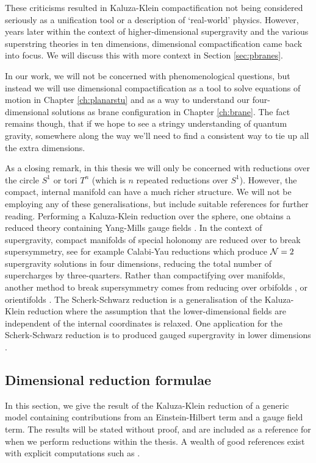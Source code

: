 These criticisms resulted in Kaluza-Klein compactification not being considered seriously as a unification tool or a description of `real-world' physics. However, years later within the context of higher-dimensional supergravity and the various superstring theories in ten dimensions, dimensional compactification came back into focus. We will discuss this with more context in Section \ref{sec:pbranes}.

In our work, we will not be concerned with phenomenological questions, but instead we will use dimensional compactification as a tool to solve equations of motion in Chapter \ref{ch:planarstu} and as a way to understand our four-dimensional solutions as brane configuration in Chapter \ref{ch:brane}.  The fact remains though, that if we hope to see a stringy understanding of quantum gravity, somewhere along the way we'll need to find a consistent way to tie up all the extra dimensions.

As a closing remark, in this thesis we will only be concerned with reductions over the circle $S^1$ or tori $T^n$ (which is $n$ repeated reductions over $S^1$). However, the compact, internal manifold can have a much richer structure. We will not be employing any of these generalisations, but include suitable references for further reading. Performing a Kaluza-Klein reduction over the sphere, one obtains a reduced theory containing Yang-Mills gauge fields \cite{Popekk}. In the context of supergravity, compact manifolds of special holonomy are reduced over to break supersymmetry, see for example Calabi-Yau reductions \cite{Candelas:1990pi, Bodner:1990zm, Duff:1994zt} which produce ${\cal N} = 2$ supergravity solutions in four dimensions, reducing the total number of supercharges by three-quarters. Rather than compactifying over manifolds, another method to break supersymmetry comes from reducing over orbifolds \cite{Bailin:1999nk}, or orientifolds \cite{Bianchi:1990yu}. The Scherk-Schwarz reduction \cite{Scherk:1978ta} is a generalisation of the Kaluza-Klein reduction where the assumption that the lower-dimensional fields are independent of the internal coordinates is relaxed. One application for the Scherk-Schwarz reduction is to produced gauged supergravity in lower dimensions \cite{Hull:2002wg, Inverso:2017lrz}.

\subsection{Dimensional reduction formulae}
\label{sec:dimredcalc}
In this section, we give the result of the Kaluza-Klein reduction of a generic model containing contributions from an Einstein-Hilbert term and a gauge field term. The results will be stated without proof, and are included as a reference for when we perform reductions within the thesis. A wealth of good references exist with explicit computations such as \cite{Vaughan:2012, Errington:2016, Popekk, Dempster:2014}. 

